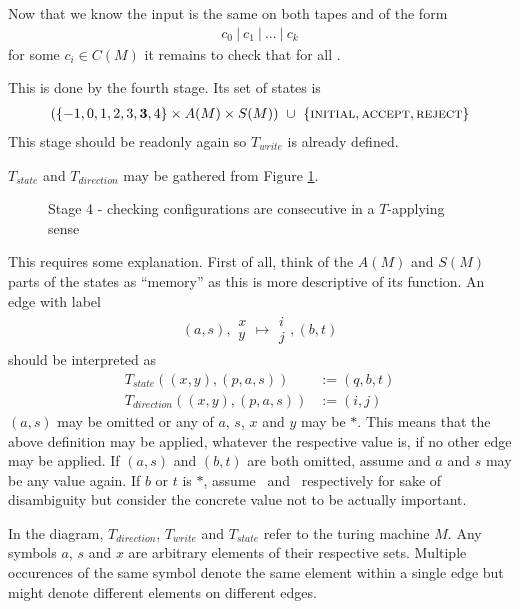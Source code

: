 	Now that we know the input is the same on both tapes and of the form
	\begin{align*}
		c_0~|~c_1~|~...~|~c_k
	\end{align*}
	for some $c_i \in C(M)$ it remains to check that  for all .

	This is done by the fourth stage.
	Its set of states is
	\begin{align*}
		(\{-1,0,1,2,3,\textbf{3},4\} \times A(M) \times S(M))~\cup~\{\text{\scshape{initial}},\text{\scshape{accept}},\text{\scshape{reject}}\}
	\end{align*}
	This stage should be readonly again so $T_{write}$ is already defined.

	$T_{state}$ and $T_{direction}$ may be gathered from Figure \ref{turing_machines:main_theorem:fig_stage4}.

	\begin{figure}
		\centering
		
		\caption{Stage 4 - checking configurations are consecutive in a $T$-applying sense}
		\label{turing_machines:main_theorem:fig_stage4}
	\end{figure}

	This requires some explanation. First of all, think of the $A(M)$ and $S(M)$ parts of the states as ``memory'' as this is more descriptive of its function.
	An edge  with label
	\begin{align*}
		(a,s),\begin{matrix} x \\ y \end{matrix} \mapsto \begin{matrix} i \\ j \end{matrix}, (b,t)
	\end{align*}
	should be interpreted as
	\begin{align*}
		T_{state}((x,y),(p,a,s)) &:= (q,b,t) \\
		T_{direction}((x,y),(p,a,s)) &:= (i,j)
	\end{align*}
	$(a,s)$ may be omitted or any of $a$, $s$, $x$ and $y$ may be $*$. This means that the above definition may be applied, whatever the respective value is, if no other edge may be applied.
	If $(a,s)$ and $(b,t)$ are both omitted, assume  and $a$ and $s$ may be any value again.
	If $b$ or $t$ is $*$, assume ~and ~respectively for sake of disambiguity but consider the concrete value not to be actually important.

	In the diagram, $T_{direction}$, $T_{write}$ and $T_{state}$ refer to the turing machine $M$.
	Any symbols $a$, $s$ and $x$ are arbitrary elements of their respective sets. Multiple occurences of the same symbol denote the same element within a single edge but might denote different elements on different edges.


